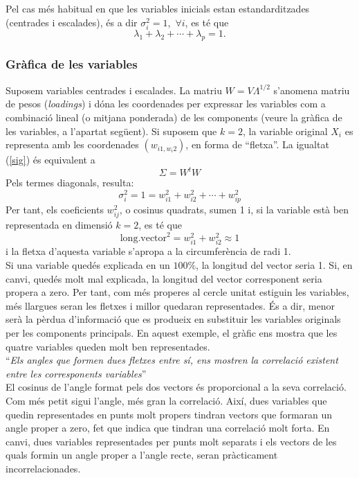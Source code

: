 \documentclass[english]{article}
\begin{document}
Pel cas més habitual en que les variables inicials estan
estandarditzades (centrades i escalades), és a dir $\sigma_i^2=1$,
$\,\forall i$, es té que
$$
\lambda_1+\lambda_2+\cdots + \lambda_p=1.
$$



\subsubsection{Gràfica de les variables}
\label{2.4.3}
 Suposem variables centrades i escalades. La matriu $W=V\Lambda^{1/2}$
s'anomena matriu de pesos (\emph{loadings})  i dóna les coordenades
per expressar  les variables com a combinació lineal (o mitjana
ponderada) de les components (veure la gràfica de les variables, a
l'apartat següent). Si suposem que $k=2$, la variable original $X_i$
 es representa amb les coordenades $(w_{i1,w_i2})$, en forma de ``fletxa''. La igualtat
 (\ref{sig}) és equivalent a
 $$
 \Sigma=W^tW
 $$
 Pels termes diagonals, resulta:
 $$
 \sigma_i^2=1=w_{i1}^2+w_{i2}^2+\cdots+w_{ip}^2
 $$
Per tant, els coeficients $w_{ij}^2$, o cosinus quadrats, sumen 1 i,
si la variable està ben representada en dimensió $k=2$, es té que
$$
\mbox{long.vector}^2=w_{i1}^2+w_{i2}^2\approx 1
$$
i la fletxa d'aquesta variable s'apropa a la circumferència de radi
1.
\\

Si una variable quedés explicada en un $100\%$, la longitud del vector seria 1. Si, en canvi, quedés molt mal explicada, la longitud del vector corresponent seria propera a zero. Per tant, com més properes al cercle unitat estiguin les variables, més llargues seran les fletxes i millor quedaran representades. És a dir, menor serà la pèrdua d'informació que es produeix en substituir les variables originals per les components principals.
En aquest exemple, el gràfic ens mostra que les quatre variables queden molt ben
representades.
\\

``\textit{Els angles que formen dues fletxes entre sí, ens mostren la correlació existent entre les corresponents variables}''
\\

El cosinus de l'angle format pels dos vectors és proporcional a la seva correlació. Com
més petit sigui l'angle, més gran la correlació. Així, dues variables que quedin
representades en punts molt propers tindran vectors que formaran un angle proper a zero, fet que indica que tindran una correlació molt forta. En canvi, dues variables representades per punts molt separats i els vectors de les quals formin un angle proper a l'angle recte, seran pràcticament incorrelacionades.
\\
\end{document}

